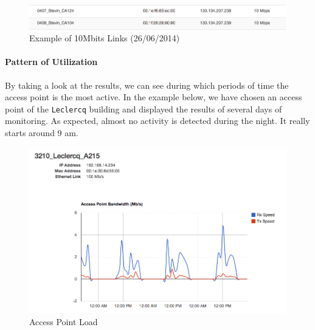 \begin{figure}[H]
   \includegraphics[width=\textwidth]{Pictures/chapter5/slowLinks.png}
   \caption{Example of 10Mbits Links (26/06/2014)}
\end{figure}

\paragraph*{Pattern of Utilization} By taking a look at the results, we can see during which periods of time the access point is the most active. In the example below, we have chosen an access point of the \texttt{Leclercq} building and displayed the results of several days of monitoring. As expected, almost no activity is detected during the night. It really starts around 9 am. 

\begin{figure}[H]
   \includegraphics[width=\textwidth]{Pictures/chapter5/apLoad.png}
   \caption{Access Point Load}
\end{figure}

